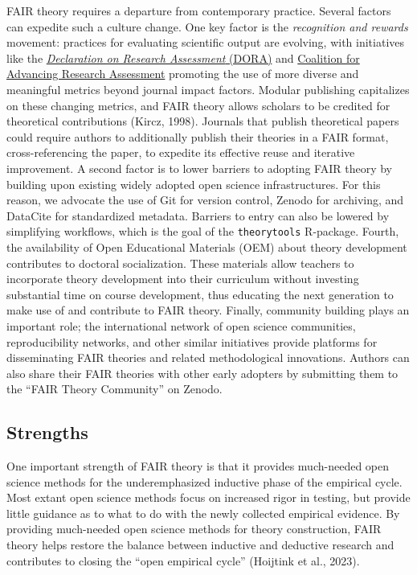 \documentclass[
  man, noextraspace,floatsintext]{apa7}
\begin{document}
FAIR theory requires a departure from contemporary practice.
Several factors can expedite such a culture change.
One key factor is the \emph{recognition and rewards} movement:
practices for evaluating scientific output are evolving, with initiatives like the \href{https://sfdora.org/read/}{\emph{Declaration on Research Assessment} (DORA)} and \href{https://coara.eu/}{Coalition for Advancing Research Assessment}
promoting the use of more diverse and meaningful metrics beyond journal impact factors.
Modular publishing capitalizes on these changing metrics,
and FAIR theory allows scholars to be credited for theoretical contributions (Kircz, 1998).
Journals that publish theoretical papers could require authors to additionally publish their theories in a FAIR format, cross-referencing the paper,
to expedite its effective reuse and iterative improvement.
A second factor is to lower barriers to adopting FAIR theory by building upon existing widely adopted open science infrastructures.
For this reason, we advocate the use of Git for version control, Zenodo for archiving, and DataCite for standardized metadata.
Barriers to entry can also be lowered by simplifying workflows, which is the goal of the \texttt{theorytools} R-package.
Fourth, the availability of Open Educational Materials (OEM) about theory development contributes to doctoral socialization.
These materials allow teachers to incorporate theory development into their curriculum without investing substantial time on course development,
thus educating the next generation to make use of and contribute to FAIR theory.
Finally, community building plays an important role;
the international network of open science communities, reproducibility networks, and other similar initiatives provide platforms for disseminating FAIR theories and related methodological innovations.
Authors can also share their FAIR theories with other early adopters by submitting them to the ``FAIR Theory Community'' on Zenodo.

\subsection{Strengths}\label{strengths}

One important strength of FAIR theory is that it provides much-needed open science methods for the underemphasized inductive phase of the empirical cycle.
Most extant open science methods focus on increased rigor in testing, but provide little guidance as to what to do with the newly collected empirical evidence.
By providing much-needed open science methods for theory construction,
FAIR theory helps restore the balance between inductive and deductive research and contributes to closing the ``open empirical cycle'' (Hoijtink et al., 2023).
\end{document}
